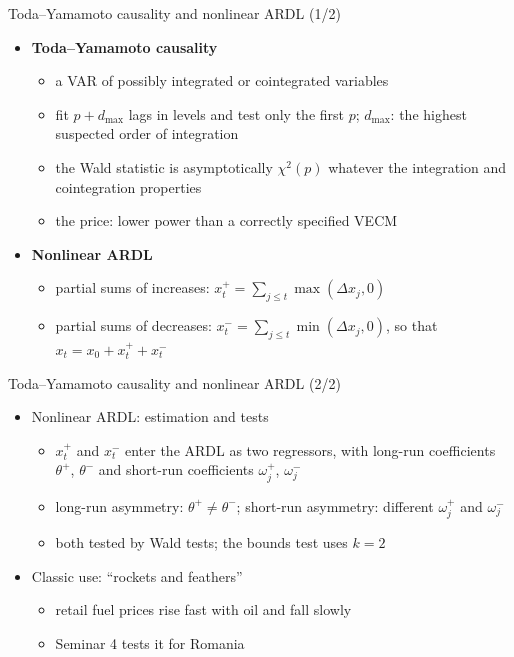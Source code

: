 \begin{frame}{Toda--Yamamoto causality and nonlinear ARDL (1/2)}
\itemsize{\small}
\begin{itemize}
    \item \textbf{Toda--Yamamoto causality} 
    \begin{itemize}
        \item a VAR of possibly integrated or cointegrated variables
        \item fit $p + d_{\max}$ lags in levels and test only the first $p$; $d_{\max}$: the highest suspected order of integration
        \item the Wald statistic is asymptotically $\chi^2(p)$ whatever the integration and cointegration properties
        \item the price: lower power than a correctly specified VECM
    \end{itemize}
    \item \textbf{Nonlinear ARDL} 
    \begin{itemize}
        \item partial sums of increases: $x_t^+ = \sum_{j\le t}\max(\Delta x_j, 0)$
        \item partial sums of decreases: $x_t^- = \sum_{j\le t}\min(\Delta x_j, 0)$, so that $x_t = x_0 + x_t^+ + x_t^-$
    \end{itemize}
\end{itemize}
\end{frame}

\begin{frame}{Toda--Yamamoto causality and nonlinear ARDL (2/2)}
\itemsize{\small}
\begin{itemize}
    \item Nonlinear ARDL: estimation and tests
    \begin{itemize}
        \item $x_t^+$ and $x_t^-$ enter the ARDL as two regressors, with long-run coefficients $\theta^+$, $\theta^-$ and short-run coefficients $\omega_j^+$, $\omega_j^-$
        \item long-run asymmetry: $\theta^+ \ne \theta^-$; short-run asymmetry: different $\omega_j^+$ and $\omega_j^-$
        \item both tested by Wald tests; the bounds test uses $k = 2$
    \end{itemize}
    \item Classic use: ``rockets and feathers'' 
    \begin{itemize}
        \item retail fuel prices rise fast with oil and fall slowly
        \item Seminar 4 tests it for Romania
    \end{itemize}
\end{itemize}
\end{frame}

